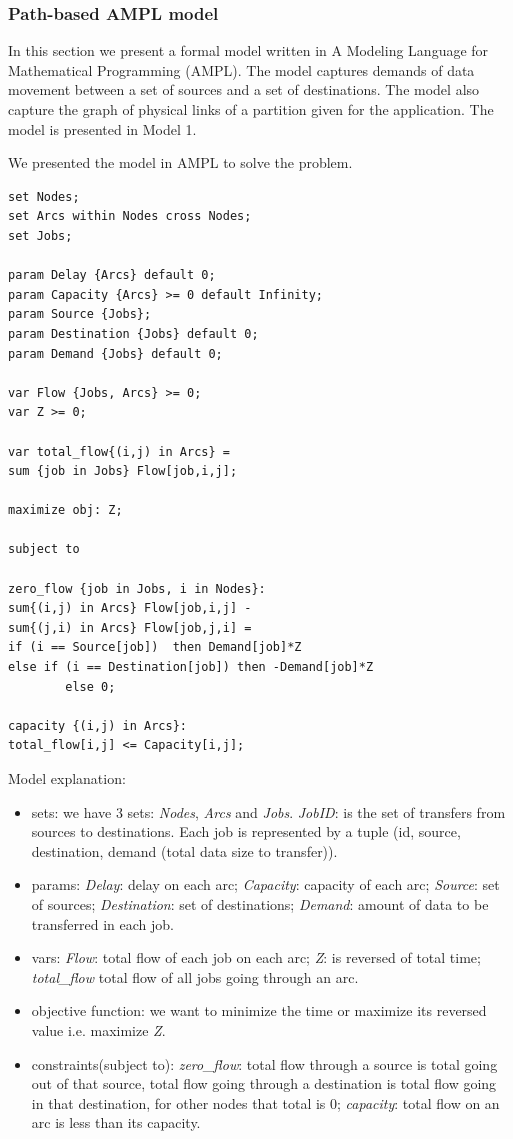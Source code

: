 \subsubsection{Path-based AMPL model}
In this section we present a formal model written in A Modeling Language for Mathematical Programming (AMPL). The model captures demands of data movement between a set of sources and a set of destinations. The model also capture the graph of physical links of a partition given for the application. The model is presented in Model 1.

We presented the model in AMPL to solve the problem.

\begin{verbatim}
set Nodes;
set Arcs within Nodes cross Nodes;
set Jobs;

param Delay {Arcs} default 0;
param Capacity {Arcs} >= 0 default Infinity;
param Source {Jobs};
param Destination {Jobs} default 0;
param Demand {Jobs} default 0;

var Flow {Jobs, Arcs} >= 0;
var Z >= 0;

var total_flow{(i,j) in Arcs} = 
sum {job in Jobs} Flow[job,i,j];

maximize obj: Z;

subject to

zero_flow {job in Jobs, i in Nodes}:
sum{(i,j) in Arcs} Flow[job,i,j] - 
sum{(j,i) in Arcs} Flow[job,j,i] = 
if (i == Source[job])  then Demand[job]*Z 
else if (i == Destination[job]) then -Demand[job]*Z 
        else 0;

capacity {(i,j) in Arcs}:
total_flow[i,j] <= Capacity[i,j];
\end{verbatim}

Model explanation:
\begin{itemize}
\item sets: we have 3 sets: \textit{Nodes}, \textit{Arcs} and \textit{Jobs}. \textit{JobID}: is the set of transfers from sources to destinations. Each job is represented by a tuple (id, source, destination, demand (total data size to transfer)).
\item params: {\it Delay}: delay on each arc; {\it Capacity}: capacity of each arc; {\it Source}: set of sources; {\it Destination}: set of destinations; {\it Demand}: amount of data to be transferred in each job.
\item vars: \textit{Flow}: total flow of each job on each arc; \textit{Z}: is reversed of total time; \textit{total\_flow} total flow of all jobs going through an arc.
\item objective function: we want to minimize the time or maximize its reversed value i.e. maximize \textit{Z}.
\item constraints(subject to): \textit{zero\_flow}: total flow through a source is total going out of that source, total flow going through a destination is total flow going in that destination, for other nodes that total is 0; \textit{capacity}: total flow on an arc is less than its capacity.
\end{itemize}

